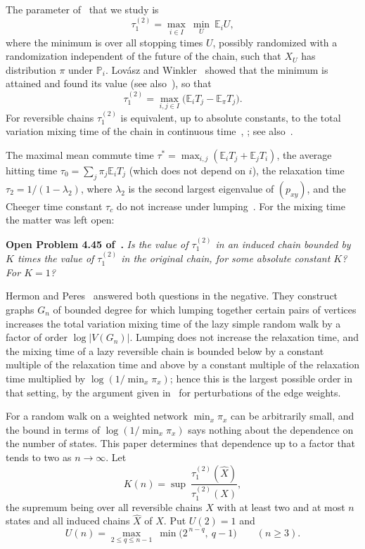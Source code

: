 \documentclass[11pt]{amsart}
\theoremstyle{definition}
\newcommand{\Prob}{\mathbb{P}}
\newcommand{\E}{\mathbb{E}}
\newcommand{\tmix}{\tau_1^{(2)}}
\newcommand{\hX}{\widehat{X}}
\begin{document}
The parameter of~\cite[Chapter~4]{AF} that we study is
\[
\tmix=\max_{i\in I}\ \min_{U}\ \E_iU ,
\]
where the minimum is over all stopping times $U$, possibly randomized with a randomization independent of the future
of the chain, such that $X_U$ has distribution $\pi$ under $\Prob_i$. Lov\'asz and Winkler~\cite{LW95} showed that the
minimum is attained and found its value (see also~\cite[Theorem~9.4]{AF}), so that
\begin{equation}\label{eq:lw}
\tmix=\max_{i,j\in I}\bigl(\E_iT_j-\E_\pi T_j\bigr).
\end{equation}
For reversible chains $\tmix$ is equivalent, up to absolute constants, to the total variation mixing time of the
chain in continuous time~\cite{Aldous82}, \cite[Theorem~4.6]{AF}; see also~\cite{LW98}.

The maximal mean commute time $\tau^*=\max_{i,j}(\E_iT_j+\E_jT_i)$, the average hitting time
$\tau_0=\sum_j\pi_j\E_iT_j$ (which does not depend on $i$), the relaxation time $\tau_2=1/(1-\lambda_2)$, where
$\lambda_2$ is the second largest eigenvalue of $(p_{xy})$, and the Cheeger time constant $\tau_c$ do not increase
under lumping~\cite[Proposition~4.44]{AF}. For the mixing time the matter was left open:

\smallskip
\noindent\textbf{Open Problem 4.45 of~\cite{AF}.} \emph{Is the value of $\tmix$ in an induced chain bounded by $K$
times the value of $\tmix$ in the original chain, for some absolute constant $K$? For $K=1$?}
\smallskip

Hermon and Peres~\cite[Theorem~3(c)]{HP} answered both questions in the negative. They construct graphs $G_n$ of
bounded degree for which lumping together certain pairs of vertices increases the total variation mixing time of the
lazy simple random walk by a factor of order $\log|V(G_n)|$. Lumping does not increase the relaxation time, and the
mixing time of a lazy reversible chain is bounded below by a constant multiple of the relaxation time and above by a
constant multiple of the relaxation time multiplied by $\log(1/\min_x\pi_x)$; hence this is the largest possible
order in that setting, by the argument given in~\cite[Remark~1.8]{HP} for perturbations of the edge weights.

For a random walk on a weighted network $\min_x\pi_x$ can be arbitrarily small, and the bound in terms of
$\log(1/\min_x\pi_x)$ says nothing about the dependence on the number of states. This paper determines that dependence
up to a factor that tends to two as $n\to\infty$. Let
\[
K(n)=\sup\ \frac{\tmix(\hX)}{\tmix(X)} ,
\]
the supremum being over all reversible chains $X$ with at least two and at most $n$ states and all induced chains
$\hX$ of $X$. Put $U(2)=1$ and
\[
U(n)=\max_{2\le q\le n-1}\ \min\bigl(2^{\,n-q},\ q-1\bigr)\qquad(n\ge3).
\]
\end{document}
